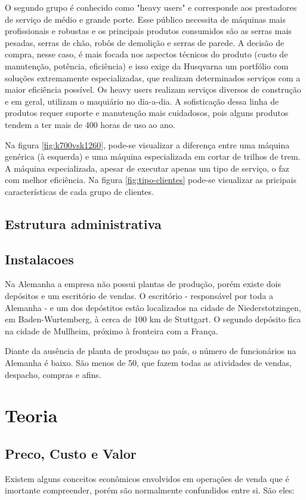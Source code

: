 \documentclass[12pt]{article}
\begin{document}
	O segundo grupo é conhecido como "heavy users" e corresponde aos prestadores de serviço de médio e grande porte. Esse público necessita de máquinas mais profissionais e robustas e os principais produtos consumidos são as serras mais pesadas, serras de chão, robôs de demolição e serras de parede. A decisão de compra, nesse caso, é mais focada nos aspectos técnicos do produto (custo de manutenção, potência, eficiência) e isso exige da Husqvarna um portfólio com soluções extremamente especializadas, que realizam determinados serviços com a maior eficiência possível. Os heavy users realizam serviços diversos de construção e em geral, utilizam o maquiário no dia-a-dia. A sofisticação dessa linha de produtos requer suporte e manutenção mais cuidadosos, pois alguns produtos tendem a ter mais de 400 horas de uso ao ano. 
	
	Na figura \ref{fig:k700vsk1260}, pode-se visualizar a diferença entre uma máquina genérica (à esquerda) e uma máquina especializada em cortar de trilhos de trem. A máquina especializada, apesar de executar apenas um tipo de serviço, o faz com melhor eficiência. Na figura \ref{fig:tipo-clientes} pode-se visualizar as pricipais características de cada grupo de clientes.
	


\subsection{Estrutura administrativa}


\subsection{Instalacoes}
Na Alemanha a empresa não possui plantas de produção, porém existe dois depósitos e um escritório de vendas. O escritório - responsável por toda a Alemanha - e um dos depóstitos estão localizados na cidade de Niederstotzingen, em Baden-Wurtemberg, à cerca de 100 km de Stuttgart. O segundo depósito fica na cidade de Mullheim, próximo à fronteira com a França.

Diante da ausência de planta de produçao no país, o número de funcionários na Alemanha é baixo. São menos de 50, que fazem todas as atividades de vendas, despacho, compras e afins.

\section{Teoria}

\subsection{Preco, Custo e Valor}
Existem alguns conceitos econômicos envolvidos em operações de venda que é imortante compreender, porém são normalmente confundidos entre si. São eles:
\end{document}
